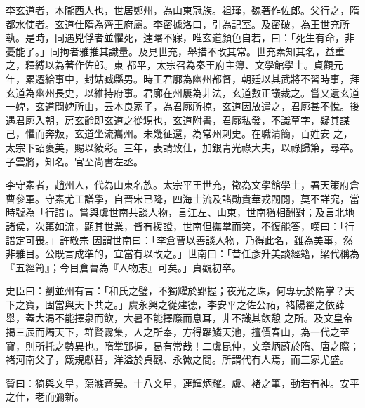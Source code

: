\begin{pinyinscope}
 李玄道者，本隴西人也，世居鄭州，為山東冠族。祖瑾，魏著作佐郎。父行之，隋都水使者。玄道仕隋為齊王府屬。李密據洛口，引為記室。及密破，為王世充所執。是時，同遇兇俘者並懼死，達曙不寐，唯玄道顏色自若，曰：「死生有命，非憂能了。」同拘者雅推其識量。及見世充，舉措不改其常。世充素知其名，益重之，釋縛以為著作佐郎。東
 都平，太宗召為秦王府主簿、文學館學士。貞觀元年，累遷給事中，封姑臧縣男。時王君廓為幽州都督，朝廷以其武將不習時事，拜玄道為幽州長史，以維持府事。君廓在州屢為非法，玄道數正議裁之。嘗又遺玄道一婢，玄道問婢所由，云本良家子，為君廓所掠，玄道因放遣之，君廓甚不悅。後遇君廓入朝，房玄齡即玄道之從甥也，玄道附書，君廓私發，不識草字，疑其謀己，懼而奔叛，玄道坐流巂州。未幾征還，為常州刺史。在職清簡，百姓安
 之，太宗下詔褒美，賜以綾彩。三年，表請致仕，加銀青光祿大夫，以祿歸第，尋卒。子雲將，知名。官至尚書左丞。



 李守素者，趙州人，代為山東名族。太宗平王世充，徵為文學館學士，署天策府倉曹參軍。守素尤工譜學，自晉宋已降，四海士流及諸勛貴華戎閥閱，莫不詳究，當時號為「行譜」。嘗與虞世南共談人物，言江左、山東，世南猶相酬對；及言北地諸侯，次第如流，顯其世業，皆有援證，世南但撫掌而笑，不復能答，嘆曰：「行譜定可畏。」許敬宗
 因謂世南曰：「李倉曹以善談人物，乃得此名，雖為美事，然非雅目。公既言成準的，宜當有以改之。」世南曰：「昔任彥升美談經籍，梁代稱為『五經笥』；今目倉曹為『人物志』可矣。」貞觀初卒。



 史臣曰：劉並州有言：「和氏之璧，不獨耀於郢握；夜光之珠，何專玩於隋掌？天下之寶，固當與天下共之。」虞永興之從建德，李安平之佐公祏，褚陽翟之依薛舉，蓋大渴不能擇泉而飲，大暑不能擇廕而息耳，非不識其飲憩
 之所。及文皇帝揭三辰而燭天下，群賢霧集，人之所奉，方得躍鱗天池，擅價春山，為一代之至寶，則所托之勢異也。隋掌郢握，曷有常哉！二虞昆仲，文章炳蔚於隋、唐之際；褚河南父子，箴規獻替，洋溢於貞觀、永徽之間。所謂代有人焉，而三家尤盛。



 贊曰：猗與文皇，蕩滌蒼昊。十八文星，連輝炳耀。虞、褚之筆，動若有神。安平之什，老而彌新。



\end{pinyinscope}